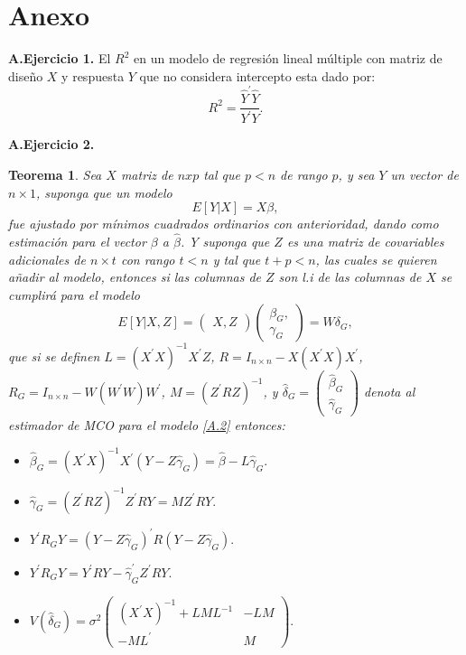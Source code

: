 \documentclass[10.5pt,notitlepage]{article}
\theoremstyle{plain}
\newtheorem{thm}{Teorema}[section] %
\begin{document}
\section{Anexo}
\textbf{A.Ejercicio 1.}
El \(R^2\) en un modelo de regresión lineal múltiple con matriz de diseño \(X\) y respuesta \(Y\) que no considera intercepto esta dado por: 
\[
R^2 = \frac{\hat{Y}^{'}\hat{Y}}{Y^{'}Y}.
\]

\textbf{A.Ejercicio 2.}
\begin{thm}\label{Teoremita}
Sea \(X\) matriz de \(n x p\) tal que \(p < n\) de rango \(p\), y sea \(Y\) un vector de \(n\times 1\), suponga que un modelo
\begin{equation}\label{A.1}
    E[Y|X] =  X \beta,
\end{equation}
fue ajustado por mínimos cuadrados ordinarios con anterioridad, dando como estimación para el vector \(\beta\) a \(\hat{\beta}\). Y suponga que \(Z\) es una matriz de covariables adicionales de \(n \times t\) con rango \(t <n\) y tal que \(t + p < n\), las cuales se quieren añadir al modelo, entonces si las columnas de \(Z\) son l.i de las columnas de \(X\) se cumplirá para el modelo
\begin{equation}\label{A.2}
    E[Y|X,Z] = \begin{pmatrix}
    X, Z
    \end{pmatrix}
    \begin{pmatrix}
    \beta_{G}, \\
    \gamma_{G}
    \end{pmatrix} = W \delta_{G}, 
\end{equation}
que si se definen \(L = (X^{'}X)^{-1}X^{'}Z\), \(R = I_{n\times n} - X(X^{'}X)X^{'}\), \(R_{G} = I_{n\times n} - W(W^{'}W)W^{'}\), \(M = (Z^{'}R Z)^{-1}\), y \(\hat{\delta}_{G} = \begin{pmatrix}\hat{\beta}_{G}\\ \hat{\gamma}_{G}\end{pmatrix}\) denota al estimador de MCO para el modelo \eqref{A.2} entonces:
\begin{itemize}
    \item[(i)] \(\hat{\beta}_{G} = (X^{'}X)^{-1}X^{'}(Y - Z \hat{\gamma}_{G}) = \hat{\beta} - L \hat{\gamma}_{G}.\) 
    \item[(ii)] \(\hat{\gamma}_{G} = (Z^{'}R Z)^{-1}Z^{'}RY= MZ^{'}RY.\)
    \item[(iii)] \(Y^{'}R_{G}Y = (Y - Z \hat{\gamma}_{G})^{'}R(Y - Z \hat{\gamma}_{G}).\)
    \item[(iv)] \(Y^{'}R_{G}Y = Y^{'}RY - \hat{\gamma}_{G}^{'}Z^{'}RY.\)
    \item[(v)] \(V(\hat{\delta}_{G}) = \sigma^2\begin{pmatrix}(X^{'}X)^{-1} + LML^{-1}&-LM\\ -ML^{'} & M \end{pmatrix}.\)
\end{itemize}
\end{thm}
\end{document}
